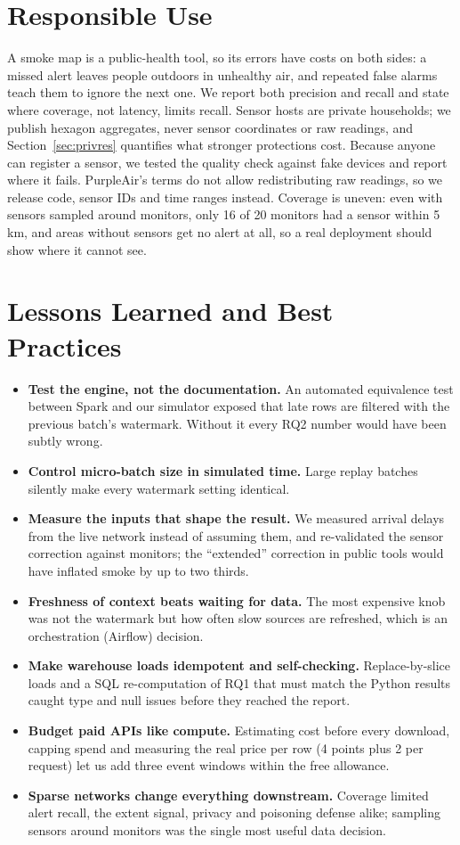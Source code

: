 \documentclass[10pt,journal,compsoc]{IEEEtran}
\begin{document}
\section{Responsible Use}
A smoke map is a public-health tool, so its errors have costs on both sides: a missed alert leaves people outdoors in unhealthy air, and repeated false alarms teach them to ignore the next one. We report both precision and recall and state where coverage, not latency, limits recall. Sensor hosts are private households; we publish hexagon aggregates, never sensor coordinates or raw readings, and Section~\ref{sec:privres} quantifies what stronger protections cost. Because anyone can register a sensor, we tested the quality check against fake devices and report where it fails. PurpleAir's terms do not allow redistributing raw readings, so we release code, sensor IDs and time ranges instead. Coverage is uneven: even with sensors sampled around monitors, only 16 of 20 monitors had a sensor within 5\,km, and areas without sensors get no alert at all, so a real deployment should show where it cannot see.

\section{Lessons Learned and Best Practices}\label{sec:lessons}
\begin{itemize}
\item \textbf{Test the engine, not the documentation.} An automated equivalence test between Spark and our simulator exposed that late rows are filtered with the previous batch's watermark. Without it every RQ2 number would have been subtly wrong.
\item \textbf{Control micro-batch size in simulated time.} Large replay batches silently make every watermark setting identical.
\item \textbf{Measure the inputs that shape the result.} We measured arrival delays from the live network instead of assuming them, and re-validated the sensor correction against monitors; the ``extended'' correction in public tools would have inflated smoke by up to two thirds.
\item \textbf{Freshness of context beats waiting for data.} The most expensive knob was not the watermark but how often slow sources are refreshed, which is an orchestration (Airflow) decision.
\item \textbf{Make warehouse loads idempotent and self-checking.} Replace-by-slice loads and a SQL re-computation of RQ1 that must match the Python results caught type and null issues before they reached the report.
\item \textbf{Budget paid APIs like compute.} Estimating cost before every download, capping spend and measuring the real price per row (4 points plus 2 per request) let us add three event windows within the free allowance.
\item \textbf{Sparse networks change everything downstream.} Coverage limited alert recall, the extent signal, privacy and poisoning defense alike; sampling sensors around monitors was the single most useful data decision.
\end{itemize}
\end{document}
